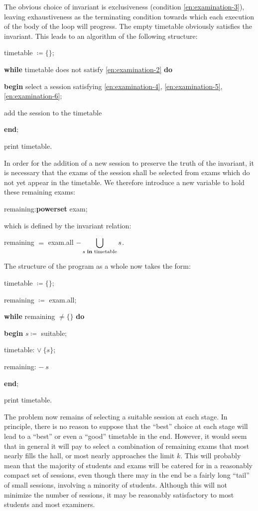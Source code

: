 The obvious choice of invariant is exclusiveness (condition \ref{en:examination-3}), leaving exhaustiveness as the terminating condition towards which each execution of the body of the loop will progress. The empty timetable obviously satisfies the invariant. This leads to an algorithm of the following structure:

\quad timetable $\coloneq \{\}$;

\quad \textbf{while} timetable does not satisfy \ref{en:examination-2} \textbf{do}

\quad \textbf{begin} select a session satisfying \ref{en:examination-4}, \ref{en:examination-5}, \ref{en:examination-6};

\quad \quad add the session to the timetable

\quad \textbf{end};

\quad print timetable.

In order for the addition of a new session to preserve the truth of the
invariant, it is necessary that the exams of the session shall be selected from
exams which do not yet appear in the timetable. We therefore introduce a
new variable to hold these remaining exams:

\quad remaining:\textbf{powerset} exam;

\noindent
which is defined by the invariant relation:

\quad remaining $=$ exam.all $- \displaystyle\bigcup_{s \text{ \textbf{in} timetable}} s$.

\noindent
The structure of the program as a whole now takes the form:

\quad timetable $\coloneq \{\}$;

\quad remaining $\coloneq$ exam.all;

\quad \textbf{while} remaining $\neq \{\}$ \textbf{do}

\quad \quad \textbf{begin} $s\coloneq$ suitable;

\quad \quad \quad timetable: $\vee\ \{s\}$;

\quad \quad \quad remaining: $-\ s$

\quad \quad \textbf{end};

\quad print timetable.

The problem now remains of selecting a suitable session at each stage. In principle, there is no reason to suppose that the ``best'' choice at each stage will lead to a ``best'' or even a ``good'' timetable in the end. However, it would seem that in general it will pay to select a combination of remaining exams that most nearly fills the hall, or most nearly approaches the limit $k$. This will probably mean that the majority of students and exams will be catered for in a reasonably compact set of sessions, even though there may in the end be a fairly long ``tail'' of small sessions, involving a minority of students. Although this will not minimize the number of sessions, it may be reasonably satisfactory to most students and most examiners.

